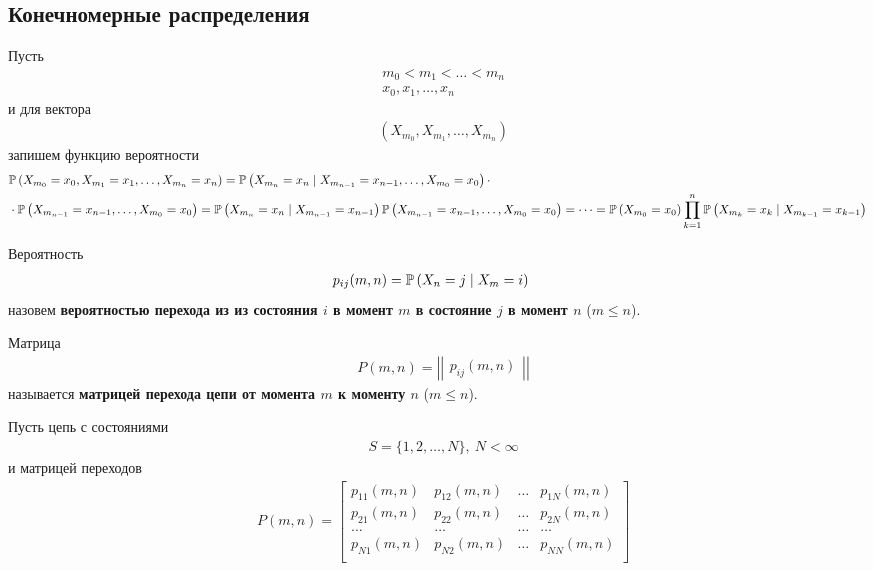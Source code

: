 \subsection{Конечномерные распределения}
Пусть
\begin{align*}
  & m_0 < m_1 < \dots < m_n \\
  & x_0, x_1, \dots, x_n
\end{align*}
и для вектора
\begin{align*}
  & \left( X_{m_0}, X_{m_1}, \dots, X_{m_n} \right)
\end{align*}
запишем функцию вероятности
\begin{align*}
  & \mathbb{P} \left( X_{m_0}=x_0, X_{m_1}=x_1, \dots, X_{m_n}=x_n \right) = \mathbb{P}\left( X_{m_n} = x_n \mid X_{m_{n-1}} = x_{n-1}, \dots, X_{m_0} = x_0 \right)\cdot \\
  & \cdot \mathbb{P}\left( X_{m_{n-1}} = x_{n-1}, \dots, X_{m_0} = x_0 \right) = \mathbb{P}\left( X_{m_n} = x_n \mid X_{m_{n-1}} = x_{n-1}\right)\mathbb{P}\left( X_{m_{n-1}} = x_{n-1}, \dots, X_{m_0} = x_0 \right) = \dots = \mathbb{P}\left( X_{m_0} = x_0 \right) \prod_{k=1}^n \mathbb{P}\left( X_{m_k} = x_{k} \mid X_{m_{k-1}} = x_{k-1} \right)
\end{align*}
\begin{Def}
    Вероятность
    \begin{align*}
      & p_{ij}(m,n) = \mathbb{P} \left( X_n=j \mid X_{m} = i\right)
    \end{align*}
    назовем \textbf{вероятностью перехода из из состояния $i$ в момент $m$ в
      состояние $j$ в момент $n$} ($m \leq n$).
\end{Def}
\begin{Def}
    Матрица
    \begin{align*}
      & P(m,n) = \left| \left| \begin{matrix} p_{ij}(m,n) \end{matrix} \right| \right|
    \end{align*}
    называется \textbf{матрицей перехода цепи от момента $m$ к моменту $n$} ($m \leq n$).
\end{Def}
\begin{example}
    Пусть цепь с состояниями
    \begin{align*}
      & S = \{1, 2, \dots, N\}, \ N < \infty
    \end{align*}
    и матрицей переходов
    \begin{align*}
      & P(m,n) = \left[ \begin{matrix}
              p_{11}(m,n) & p_{12}(m,n) & \dots & p_{1N}(m,n) \\
              p_{21}(m,n) & p_{22}(m,n) & \dots & p_{2N}(m,n) \\
              \dots & \dots & \dots & \dots \\
              p_{N1}(m,n) & p_{N2}(m,n) & \dots & p_{NN}(m,n) \\
          \end{matrix} \right]
    \end{align*}
\end{example}
